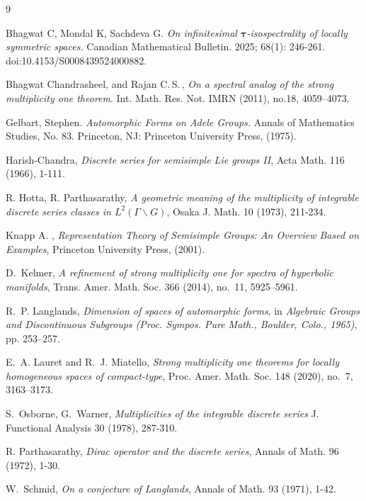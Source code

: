 \documentclass[11 pt]{amsart}
\theoremstyle{definition}
\numberwithin{equation}{section}
\begin{document}
\begin{thebibliography}{9}


Bhagwat C, Mondal K, Sachdeva G. \textit{On infinitesimal $\boldsymbol {\tau}$-isospectrality of locally symmetric spaces.} Canadian Mathematical Bulletin. 2025; 68(1): 246-261. doi:10.4153/S0008439524000882.

Bhagwat Chandrasheel, and Rajan  C.\,S.\,,
\textit{On a spectral analog of the strong multiplicity one theorem}.
Int. Math. Res. Not. IMRN (2011), no.18, 4059--4073.

Gelbart, Stephen. \textit{Automorphic Forms on Adele Groups.} Annals of Mathematics Studies, No. 83. Princeton, NJ: Princeton University Press, (1975).

Harish-Chandra, \textit{Discrete series for semisimple Lie groups II}, Acta Math. 116 (1966), 1-111.

R. Hotta, R. Parthasarathy, \textit{A geometric meaning of the multiplicity of integrable discrete series classes in $L^2(\Gamma \backslash G)$}, Osaka J. Math. 10 (1973), 211-234.


Knapp A. , \textit{Representation Theory of Semisimple Groups: An Overview Based on Examples},
Princeton University Press, (2001).

D.~Kelmer, \textit{A refinement of strong multiplicity one for spectra of hyperbolic manifolds}, Trans. Amer. Math. Soc. 366 (2014), no.~11, 5925--5961. 

R.~P. Langlands, \textit{Dimension of spaces of automorphic forms}, in {\it Algebraic Groups and Discontinuous Subgroups (Proc. Sympos. Pure Math., Boulder, Colo., 1965)}, pp. 253--257. 

E.~A. Lauret and R.~J. Miatello, \textit{Strong multiplicity one theorems for locally homogeneous spaces of compact-type}, Proc. Amer. Math. Soc. 148 (2020), no.~7, 3163--3173. 

S.~Osborne, G.~Warner, \textit{Multiplicities of the integrable discrete series}
J. Functional Analysis 30 (1978), 287-310.

R. Parthasarathy, \textit{Dirac operator and the discrete series}, Annals of Math. 96 (1972), 1-30.

W.~Schmid, \textit{On a conjecture of Langlands}, Annals of Math. 93 (1971), 1-42.


\end{thebibliography}
\end{document}
